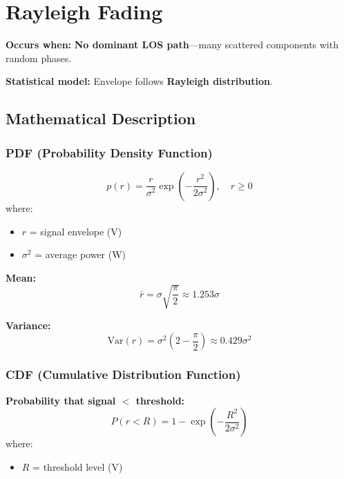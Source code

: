 \section{Rayleigh Fading}

\textbf{Occurs when:} \textbf{No dominant LOS path}---many scattered components with random phases.

\textbf{Statistical model:} Envelope follows \textbf{Rayleigh distribution}.

\subsection{Mathematical Description}

\subsubsection{PDF (Probability Density Function)}

\begin{equation}
p(r) = \frac{r}{\sigma^2} \exp\left(-\frac{r^2}{2\sigma^2}\right), \quad r \geq 0
\label{eq:rayleigh-pdf}
\end{equation}
where:
\begin{itemize}
\item $r$ = signal envelope (V)
\item $\sigma^2$ = average power (W)
\end{itemize}

\textbf{Mean:}
\begin{equation}
\bar{r} = \sigma\sqrt{\frac{\pi}{2}} \approx 1.253\sigma
\label{eq:rayleigh-mean}
\end{equation}

\textbf{Variance:}
\begin{equation}
\text{Var}(r) = \sigma^2\left(2 - \frac{\pi}{2}\right) \approx 0.429\sigma^2
\label{eq:rayleigh-variance}
\end{equation}

\subsubsection{CDF (Cumulative Distribution Function)}

\textbf{Probability that signal $<$ threshold:}
\begin{equation}
P(r < R) = 1 - \exp\left(-\frac{R^2}{2\sigma^2}\right)
\label{eq:rayleigh-cdf}
\end{equation}
where:
\begin{itemize}
\item $R$ = threshold level (V)
\end{itemize}

